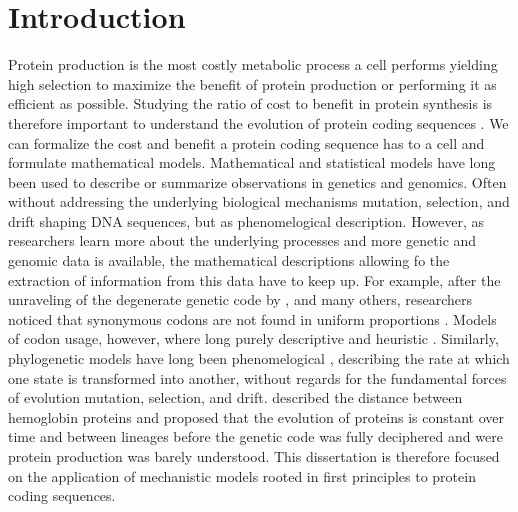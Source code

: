 \chapter{Introduction} 
\label{ch:introduction}

Protein production is the most costly metabolic process a cell performs \citep{buttgereit1995,warner1999,AkashiAndGojobori2002,lindqvist2018} yielding high selection to maximize the benefit of protein production or performing it as efficient as possible.
Studying the ratio of cost to benefit in protein synthesis is therefore important to understand the evolution of protein coding sequences \citep{gilchrist2009,ShahAndGilchrist2011,gilchrist2015,beaulieu2018}.
We can formalize the cost and benefit a protein coding sequence has to a cell and formulate mathematical models.
Mathematical and statistical models have long been used to describe or summarize observations in genetics and genomics.
Often without addressing the underlying biological mechanisms mutation, selection, and drift shaping DNA sequences, but as phenomelogical description.
However, as researchers learn more about the underlying processes and more genetic and genomic data is available, the mathematical descriptions allowing fo the extraction of information from this data have to keep up.
For example, after the unraveling of the degenerate genetic code by \citet{MatthaeiAndNirenberg1961,NirenbergAndMatthaei1961,Maxwell1962,LederAndNirenberg1964}, and many others, researchers noticed that synonymous codons are not found in uniform proportions \citep{fitch1976,grantham1980,ikemura1981,grantham1981,sharp1988}.
Models of codon usage, however, where long purely descriptive and heuristic \citep{ikemura1981,BennetzenAndHall1982,sharp1987,Wright1990}.
Similarly, phylogenetic models have long been phenomelogical \citep{JukesAndCantor1969,Dayhoff1978,Kimura1980,felsenstein1981,Altschul1991}, describing the rate at which one state is transformed into another, without regards for the fundamental forces of evolution mutation, selection, and drift.
\citet{ZuckerkandlAndPauling1962} described the distance between hemoglobin proteins and proposed that the evolution of proteins is constant over time and between lineages before the genetic code was fully deciphered and were protein production was barely understood.
This dissertation is therefore focused on the application of mechanistic models rooted in first principles to protein coding sequences.

